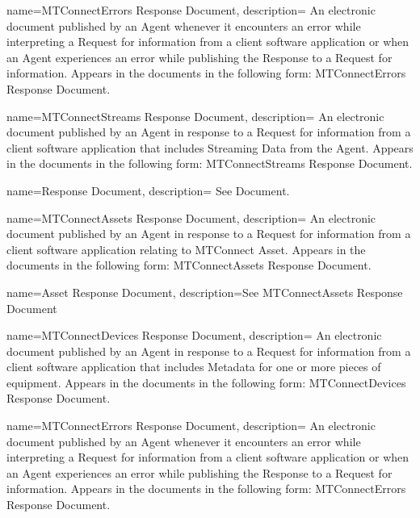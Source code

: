 {
    name={MTConnectErrors Response Document},
	description={
	An electronic document published by an \gls{Agent} whenever it encounters an error while interpreting a \gls{Request} for information from a client software application or when an \gls{Agent} experiences an error while publishing the \gls{Response} to a \gls{Request} for information.
	Appears in the documents in the following form: \gls{MTConnectErrors Response Document}.
}
}

{
    name={MTConnectStreams Response Document},
	description={
	An electronic document published by an \gls{Agent} in response to a \gls{Request} for information from a client software application that includes \gls{Streaming Data} from the \gls{Agent}.
	Appears in the documents in the following form: \gls{MTConnectStreams Response Document}.
}
}

{
    name={Response Document},
	description={
	See \gls{Document}.
}
}

{
    name={MTConnectAssets Response Document},
	description={
	An electronic document published by an \gls{Agent} in response to a \gls{Request} for information from a client software application relating to \gls{MTConnect Asset}.
	Appears in the documents in the following form: \gls{MTConnectAssets Response Document}.
}
}

{
    name={Asset Response Document},
	description={See \gls{MTConnectAssets Response Document}}
}

{
    name={MTConnectDevices Response Document},
	description={
	An electronic document published by an \gls{Agent} in response to a \gls{Request} for information from a client software application that includes \gls{Metadata} for one or more pieces of equipment.
	Appears in the documents in the following form: \gls{MTConnectDevices Response Document}.
}
}

{
    name={MTConnectErrors Response Document},
	description={
	An electronic document published by an \gls{Agent} whenever it encounters an error while interpreting a \gls{Request} for information from a client software application or when an \gls{Agent} experiences an error while publishing the \gls{Response} to a \gls{Request} for information.
	Appears in the documents in the following form: \gls{MTConnectErrors Response Document}.
}
}

